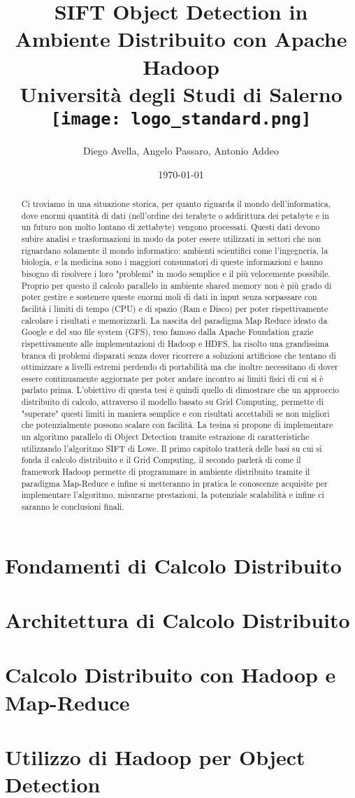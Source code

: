 \documentclass[12pt,a4paper,oneside]{report}
\title{
  {SIFT Object Detection in Ambiente Distribuito con Apache Hadoop}\\
  {\large Università degli Studi di Salerno}\\
  {\texttt{[image: logo\_standard.png]}}
}
\author{Diego Avella, Angelo Passaro, Antonio Addeo}
\date{\today}
\begin{document}
  \maketitle
  \begin{abstract}
    Ci troviamo in una situazione storica, per quanto riguarda il mondo dell'informatica, dove enormi quantità di dati (nell'ordine dei terabyte o addirittura dei petabyte e in un  futuro non molto lontano di zettabyte) vengono processati. Questi dati devono subire analisi e trasformazioni in modo da poter essere utilizzati in settori che non riguardano solamente il mondo informatico: ambienti scientifici come l'ingegneria, la biologia, e la medicina sono i maggiori consumatori di queste informazioni e hanno bisogno di risolvere i loro "problemi" in modo semplice e il più velocemente possibile. Proprio per questo il calcolo parallelo in ambiente shared memory non è più grado di poter gestire e sostenere queste enormi moli di dati in input senza sorpassare con facilità i limiti di tempo (CPU) e di spazio (Ram e Disco) per poter rispettivamente calcolare i risultati e memorizzarli. La nascita del paradigma Map Reduce ideato da Google e del suo file system (GFS), reso famoso dalla Apache Foundation grazie rispettivamente alle implementazioni di Hadoop e HDFS, ha risolto una grandissima branca di problemi disparati senza dover ricorrere a soluzioni artificiose che tentano di ottimizzare a livelli estremi perdendo di portabilità ma che inoltre necessitano di dover essere continuamente aggiornate per poter andare incontro ai limiti fisici di cui si è parlato prima. L'obiettivo di questa tesi è quindi quello di dimostrare che un approccio distribuito di calcolo, attraverso il modello basato su Grid Computing, permette di "superare" questi limiti in maniera semplice e con risultati accettabili se non migliori che potenzialmente possono scalare con facilità. La tesina si propone di implementare un algoritmo parallelo di Object Detection tramite estrazione di caratteristiche utilizzando l'algoritmo SIFT di Lowe. Il primo capitolo tratterà delle basi su cui si fonda il calcolo distribuito e il Grid Computing, il secondo parlerà di come il framework Hadoop permette di programmare in ambiente distribuito tramite il paradigma Map-Reduce e infine si metteranno in pratica le conoscenze acquisite per implementare l'algoritmo, misurarne prestazioni, la potenziale scalabilità e infine ci saranno le conclusioni finali.
  \end{abstract}
  \tableofcontents
  \chapter{Fondamenti di Calcolo Distribuito}
  
  \chapter{Architettura di Calcolo Distribuito}
  
  \chapter{Calcolo Distribuito con Hadoop e Map-Reduce}
  
  \chapter{Utilizzo di Hadoop per Object Detection }
  
  
\end{document}
